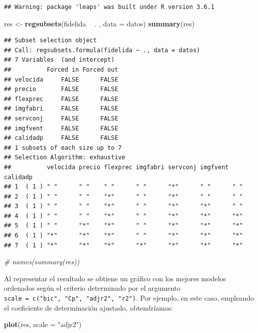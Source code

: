 \documentclass[]{book}
\newenvironment{Shaded}{\begin{snugshade}}{\end{snugshade}}
\newcommand{\CommentTok}[1]{\textcolor[rgb]{0.56,0.35,0.01}{\textit{#1}}}
\newcommand{\DataTypeTok}[1]{\textcolor[rgb]{0.13,0.29,0.53}{#1}}
\newcommand{\KeywordTok}[1]{\textcolor[rgb]{0.13,0.29,0.53}{\textbf{#1}}}
\newcommand{\NormalTok}[1]{#1}
\newcommand{\OperatorTok}[1]{\textcolor[rgb]{0.81,0.36,0.00}{\textbf{#1}}}
\newcommand{\StringTok}[1]{\textcolor[rgb]{0.31,0.60,0.02}{#1}}
\begin{document}
\begin{verbatim}
## Warning: package 'leaps' was built under R version 3.6.1
\end{verbatim}

\begin{Shaded}
\begin{Highlighting}[]
\NormalTok{res <-}\StringTok{ }\KeywordTok{regsubsets}\NormalTok{(fidelida }\OperatorTok{~}\StringTok{ }\NormalTok{. , }\DataTypeTok{data =}\NormalTok{ datos)}
\KeywordTok{summary}\NormalTok{(res)}
\end{Highlighting}
\end{Shaded}

\begin{verbatim}
## Subset selection object
## Call: regsubsets.formula(fidelida ~ ., data = datos)
## 7 Variables  (and intercept)
##          Forced in Forced out
## velocida     FALSE      FALSE
## precio       FALSE      FALSE
## flexprec     FALSE      FALSE
## imgfabri     FALSE      FALSE
## servconj     FALSE      FALSE
## imgfvent     FALSE      FALSE
## calidadp     FALSE      FALSE
## 1 subsets of each size up to 7
## Selection Algorithm: exhaustive
##          velocida precio flexprec imgfabri servconj imgfvent calidadp
## 1  ( 1 ) " "      " "    " "      " "      "*"      " "      " "     
## 2  ( 1 ) " "      " "    "*"      " "      "*"      " "      " "     
## 3  ( 1 ) " "      " "    "*"      " "      "*"      "*"      " "     
## 4  ( 1 ) " "      " "    "*"      " "      "*"      "*"      "*"     
## 5  ( 1 ) " "      "*"    "*"      " "      "*"      "*"      "*"     
## 6  ( 1 ) "*"      "*"    "*"      " "      "*"      "*"      "*"     
## 7  ( 1 ) "*"      "*"    "*"      "*"      "*"      "*"      "*"
\end{verbatim}

\begin{Shaded}
\begin{Highlighting}[]
\CommentTok{# names(summary(res))}
\end{Highlighting}
\end{Shaded}

Al representar el resultado se obtiene un gráfico con los mejores modelos ordenados
según el criterio determinado por el argumento \texttt{scale\ =\ c("bic",\ "Cp",\ "adjr2",\ "r2")}.
Por ejemplo, en este caso, empleando el coeficiente de determinación ajustado, obtendríamos:

\begin{Shaded}
\begin{Highlighting}[]
\KeywordTok{plot}\NormalTok{(res, }\DataTypeTok{scale =} \StringTok{"adjr2"}\NormalTok{)}
\end{Highlighting}
\end{Shaded}
\end{document}
